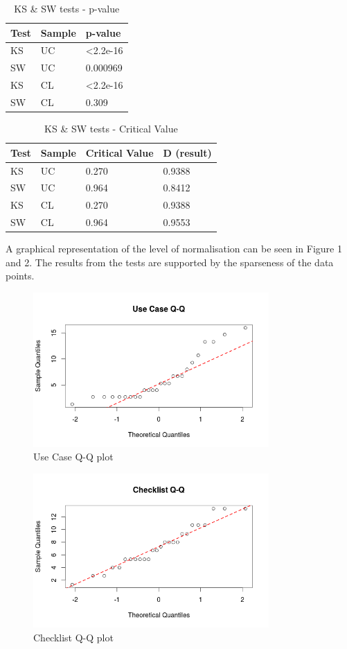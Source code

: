 \documentclass[10pt,twocolumn]{article}
\begin{document}
\begin{table}
	\centering
	\begin{tabular}[ht]{| l | l | l |}
	\hline
	Test & Sample & p-value  \\
	\hline
	KS & UC & \textless 2.2e-16 \\
	\hline
	SW & UC & 0.000969 \\
	\hline
	KS & CL & \textless 2.2e-16 \\
	\hline
	SW & CL & 0.309 \\	
	\hline
	\end{tabular}
	\caption{KS \& SW tests - p-value}
\end{table}


\begin{table}
	\centering
	\begin{tabular}[ht]{| l | l | l | l |}
	\hline
	Test & Sample & Critical Value & D (result)  \\
	\hline
	KS & UC & 0.270 & 0.9388 \\
	\hline
	SW & UC & 0.964 &  0.8412 \\
	\hline
	KS & CL & 0.270 & 0.9388 \\
	\hline
	SW & CL & 0.964 & 0.9553 \\	
	\hline
	\end{tabular}
	\caption{KS \& SW tests - Critical Value}
\end{table}


A graphical representation of the level of normalisation can be seen in Figure 1 and 2. The results from the tests are supported by the sparseness of the data points. 

\begin{figure}[ht]
\centering
\includegraphics[width=90mm]{uc_qq.png}
\caption{Use Case Q-Q plot}
\end{figure}

\begin{figure}[ht]
\centering
\includegraphics[width=90mm]{cl_qq.png}
\caption{Checklist Q-Q plot}
\end{figure}
\end{document}
